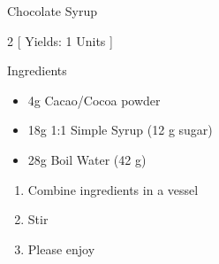 \begin{Large}
    Chocolate Syrup
\end{Large}

\begin{scriptsize}
\begin{multicols}{2}
[
\vspace{1em}
Yields: 1 Units
\vspace{-1.5em}
]

Ingredients
\begin{itemize}
    \item 4g Cacao/Cocoa powder
    \item 18g 1:1 Simple Syrup (12 g sugar)
    \item 28g Boil Water (42 g) 
\end{itemize}
\end{multicols}
\end{scriptsize}

\begin{footnotesize}
\begin{enumerate}
    \item Combine ingredients in a vessel
    \item Stir
    \item Please enjoy
\end{enumerate}
\end{footnotesize}

\vspace{2em}
